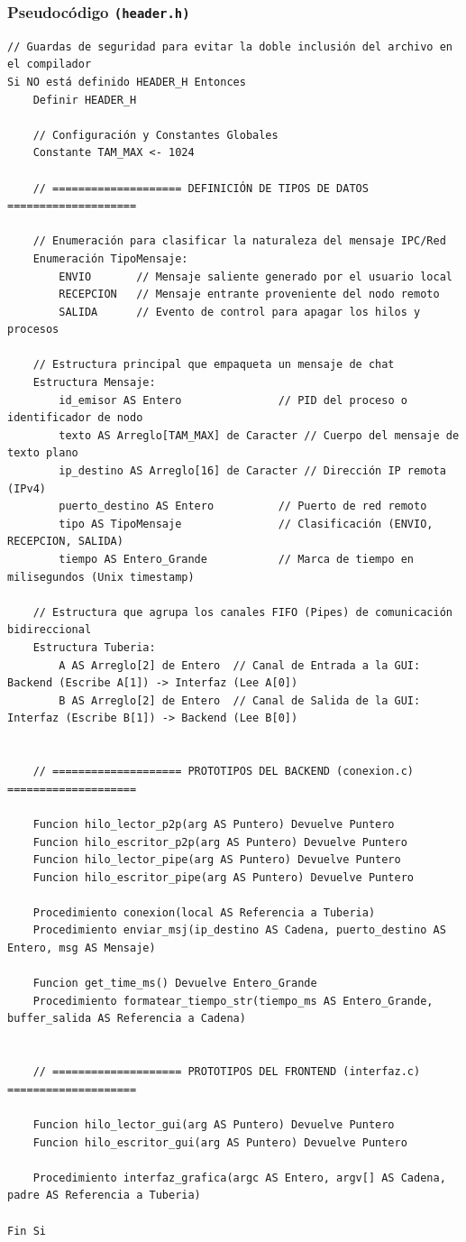 \subsubsection{\large Pseudocódigo \texttt{(header.h)}}
\begin{lstlisting}[style=estiloPseudo]
// Guardas de seguridad para evitar la doble inclusión del archivo en el compilador
Si NO está definido HEADER_H Entonces
    Definir HEADER_H

    // Configuración y Constantes Globales
    Constante TAM_MAX <- 1024

    // ==================== DEFINICIÓN DE TIPOS DE DATOS ====================

    // Enumeración para clasificar la naturaleza del mensaje IPC/Red
    Enumeración TipoMensaje:
        ENVIO       // Mensaje saliente generado por el usuario local
        RECEPCION   // Mensaje entrante proveniente del nodo remoto
        SALIDA      // Evento de control para apagar los hilos y procesos

    // Estructura principal que empaqueta un mensaje de chat
    Estructura Mensaje:
        id_emisor AS Entero               // PID del proceso o identificador de nodo
        texto AS Arreglo[TAM_MAX] de Caracter // Cuerpo del mensaje de texto plano
        ip_destino AS Arreglo[16] de Caracter // Dirección IP remota (IPv4)
        puerto_destino AS Entero          // Puerto de red remoto
        tipo AS TipoMensaje               // Clasificación (ENVIO, RECEPCION, SALIDA)
        tiempo AS Entero_Grande           // Marca de tiempo en milisegundos (Unix timestamp)

    // Estructura que agrupa los canales FIFO (Pipes) de comunicación bidireccional
    Estructura Tuberia:
        A AS Arreglo[2] de Entero  // Canal de Entrada a la GUI:  Backend (Escribe A[1]) -> Interfaz (Lee A[0])
        B AS Arreglo[2] de Entero  // Canal de Salida de la GUI: Interfaz (Escribe B[1]) -> Backend (Lee B[0])


    // ==================== PROTOTIPOS DEL BACKEND (conexion.c) ====================
    
    Funcion hilo_lector_p2p(arg AS Puntero) Devuelve Puntero
    Funcion hilo_escritor_p2p(arg AS Puntero) Devuelve Puntero
    Funcion hilo_lector_pipe(arg AS Puntero) Devuelve Puntero
    Funcion hilo_escritor_pipe(arg AS Puntero) Devuelve Puntero
    
    Procedimiento conexion(local AS Referencia a Tuberia)
    Procedimiento enviar_msj(ip_destino AS Cadena, puerto_destino AS Entero, msg AS Mensaje)
    
    Funcion get_time_ms() Devuelve Entero_Grande
    Procedimiento formatear_tiempo_str(tiempo_ms AS Entero_Grande, buffer_salida AS Referencia a Cadena)


    // ==================== PROTOTIPOS DEL FRONTEND (interfaz.c) ====================
    
    Funcion hilo_lector_gui(arg AS Puntero) Devuelve Puntero
    Funcion hilo_escritor_gui(arg AS Puntero) Devuelve Puntero
    
    Procedimiento interfaz_grafica(argc AS Entero, argv[] AS Cadena, padre AS Referencia a Tuberia)

Fin Si
\end{lstlisting}